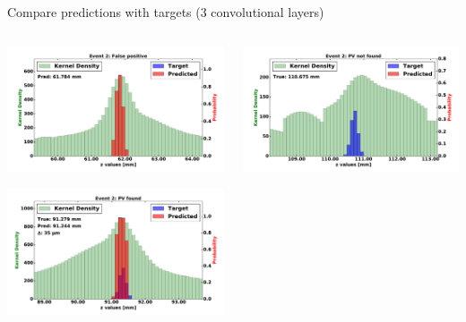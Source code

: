 \begin{frame}{Compare predictions with targets (3 convolutional layers)}
  \begin{columns}[c]
        \begin{center}
            \includegraphics[width=1\textwidth,height=0.45\textwidth, trim=18 0 18 0]{images/120000_3layer_12.pdf}
    
            \includegraphics[width=1\textwidth, height=0.45\textwidth,trim=18 0 18 0]{images/120000_3layer_13.pdf}

        \end{center}
        \begin{center}
           \includegraphics[width=1\textwidth, height=0.45\textwidth, trim=18 0 18 0]{images/120000_3layer_14.pdf}
    

\end{center}
\end{columns}
\end{frame}
